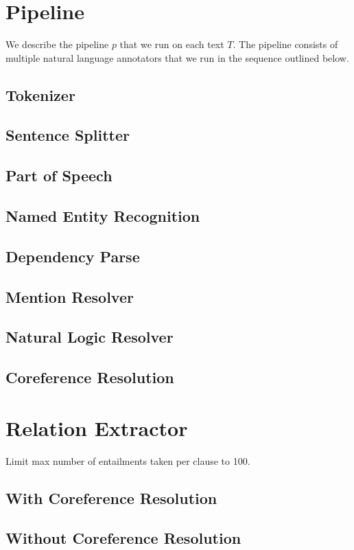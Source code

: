 
\section{Pipeline}
We describe the pipeline $p$ that we run on each text $T$. The pipeline
consists of multiple natural language annotators that we run in 
the sequence outlined below.
\citep{manning2014stanford}
\subsection{Tokenizer}
\subsection{Sentence Splitter}
\subsection{Part of Speech}
\citet{toutanova2003tagger}
\subsection{Named Entity Recognition}
\citet{finkel2005incorporating}
\subsection{Dependency Parse}
\citet{chen2014nndep}
\subsection{Mention Resolver}

\subsection{Natural Logic Resolver}
\subsection{Coreference Resolution}
\citet{clark2015coref}

\section{Relation Extractor}
Limit max number of entailments taken per clause to 100.
\citet{angeli2015openie}
\citet{fader11reverb}

\subsection{With Coreference Resolution}

\subsection{Without Coreference Resolution}
